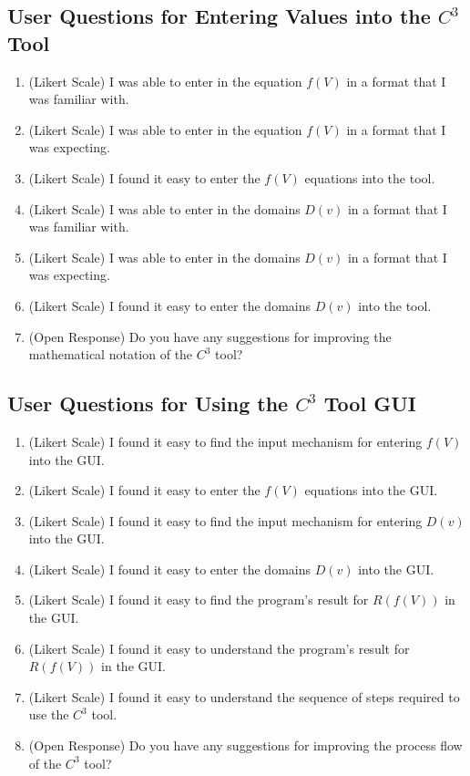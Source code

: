 \documentclass[12pt, titlepage]{article}
\newcommand{\prognameAbbrv}{$C^{3}$}
\begin{document}
\subsection{User Questions for Entering Values into the \prognameAbbrv{} 
Tool}
\label{questions_inputs}

\begin{enumerate}
	\item (Likert Scale) I was able to enter in the equation $f(V)$ in a format 
	that I was familiar with.
	\item (Likert Scale) I was able to enter in the equation $f(V)$ in a format 
	that I was expecting.
	\item (Likert Scale) I found it easy to enter the $f(V)$ equations into the 
	tool.
	\item (Likert Scale) I was able to enter in the domains $D(v)$ in a format 
	that I was familiar with.
	\item (Likert Scale) I was able to enter in the domains $D(v)$ in a format 
	that I was expecting.
	\item (Likert Scale) I found it easy to enter the domains $D(v)$ into the 
	tool.
	\item (Open Response) Do you have any suggestions for improving the 
	mathematical notation of the \prognameAbbrv{} tool?
\end{enumerate}

\subsection{User Questions for Using the \prognameAbbrv{} Tool GUI}
\label{questions_GUI}

\begin{enumerate}
	\item (Likert Scale) I found it easy to find the input mechanism for 
	entering $f(V)$ into the GUI.
	\item (Likert Scale) I found it easy to enter the $f(V)$ equations into the 
	GUI.
	\item (Likert Scale) I found it easy to find the input mechanism for 
	entering $D(v)$ into the GUI.
	\item (Likert Scale) I found it easy to enter the domains $D(v)$ into the 
	GUI.
	\item (Likert Scale) I found it easy to find the program's result for 
	$R(f(V))$ in the GUI.
	\item (Likert Scale) I found it easy to understand the program's result for 
	$R(f(V))$ in the GUI.
	\item (Likert Scale) I found it easy to understand the sequence of steps 
	required to use the \prognameAbbrv{} tool.
	\item (Open Response) Do you have any suggestions for improving the 
	process flow of the \prognameAbbrv{} tool?
\end{enumerate}
\end{document}
